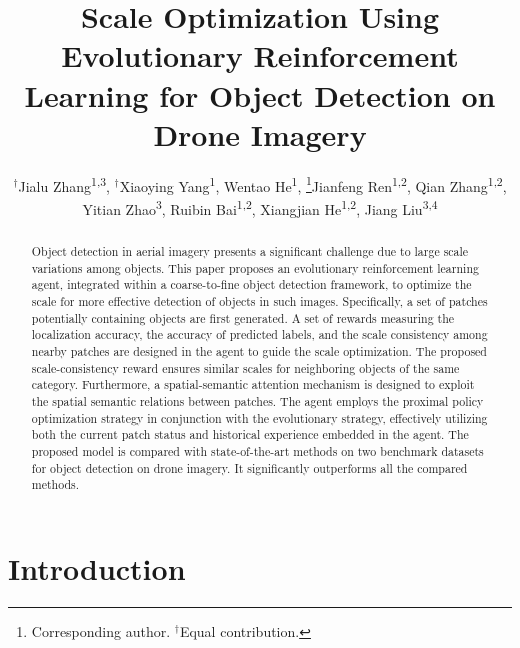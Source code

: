 \documentclass[letterpaper]{article} %
\title{Scale Optimization Using Evolutionary Reinforcement Learning for Object Detection on Drone Imagery}
\author{
  $^\dagger$Jialu Zhang\textsuperscript{\rm 1,3}, 
  $^\dagger$Xiaoying Yang\textsuperscript{\rm 1}, 
  Wentao He\textsuperscript{\rm 1}, 
  \thanks{Corresponding author. $^\dagger$Equal contribution.}Jianfeng Ren\textsuperscript{\rm 1,2},
  Qian Zhang\textsuperscript{\rm 1,2},
  Yitian Zhao\textsuperscript{\rm 3},
  Ruibin Bai\textsuperscript{\rm 1,2},
  Xiangjian He\textsuperscript{\rm 1,2},
  Jiang Liu\textsuperscript{\rm 3,4}
}
\newcommand\blue[1]{\textcolor{blue}{#1}}
\begin{document}
\maketitle

\begin{abstract}
Object detection in aerial imagery presents a significant challenge due to large scale variations among objects. This paper proposes an evolutionary reinforcement learning agent, integrated within a coarse-to-fine object detection framework, to optimize the scale for more effective detection of objects in such images. 
Specifically, a set of patches potentially containing objects are first generated. 
A set of rewards measuring the localization accuracy, the accuracy of predicted labels, and the scale consistency among nearby patches are designed in the agent to guide the scale optimization. The proposed scale-consistency reward ensures similar scales for neighboring objects of the same category. 
Furthermore, a spatial-semantic attention mechanism is designed to exploit the spatial semantic relations between patches. 
The agent employs the proximal policy optimization strategy in conjunction with the evolutionary strategy, effectively utilizing both the current patch status and historical experience embedded in the agent.  
The proposed model is compared with state-of-the-art methods on two benchmark datasets for object detection on drone imagery. It significantly outperforms all the compared methods. %
\end{abstract}

\section{Introduction}
\label{sec: intro}
\end{document}
